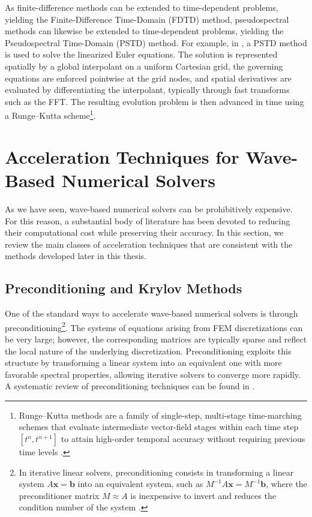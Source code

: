 \documentclass{Configuration_Files/PoliMi3i_thesis}
\newif\ifshowthesischanges
\DeclareRobustCommand{\thesischange}[2]{%
    \ifshowthesischanges
        \textcolor{#1}{#2}%
    \else
        #2%
    \fi
}
\def\thesischange#1#2{#2}%
\begin{document}
As finite-difference methods can be extended to time-dependent problems, yielding the Finite-Difference Time-Domain (FDTD) method, pseudospectral methods can likewise be extended to time-dependent problems, yielding the Pseudospectral Time-Domain (PSTD) method. For example, in \cite{hornikx_extended_2010}, a PSTD method is used to solve the linearized Euler equations. The solution is represented spatially by a global interpolant on a uniform Cartesian grid, the governing equations are enforced pointwise at the grid nodes, and spatial derivatives are evaluated by differentiating the interpolant, typically through fast transforms such as the FFT. The resulting evolution problem is then advanced in time using a Runge--Kutta scheme\footnote{\thesischange{red}{Runge--Kutta methods are a family of single-step, multi-stage time-marching schemes that evaluate intermediate vector-field stages within each time step $[t^n, t^{n+1}]$ to attain high-order temporal accuracy without requiring previous time levels \citep{quarteroni_numerical_2007}.}}.
%
\section{Acceleration Techniques for Wave-Based Numerical Solvers}
As we have seen, wave-based numerical solvers can be prohibitively expensive. For this reason, a substantial body of literature has been devoted to reducing their computational cost while preserving their accuracy. In this section, we review the main classes of acceleration techniques that are consistent with the methods developed later in this thesis.
%
\subsection{Preconditioning and Krylov Methods}
One of the standard ways to accelerate wave-based numerical solvers is through preconditioning\footnote{\thesischange{red}{In iterative linear solvers, preconditioning consists in transforming a linear system $A\mathbf{x}=\mathbf{b}$ into an equivalent system, such as $M^{-1}A\mathbf{x} = M^{-1}\mathbf{b}$, where the preconditioner matrix $M \approx A$ is inexpensive to invert and reduces the condition number of the system \citep{chen_matrix_2005}.}}. The systems of equations arising from FEM discretizations can be very large; however, the corresponding matrices are typically sparse and reflect the local nature of the underlying discretization. Preconditioning exploits this structure by transforming a linear system into an equivalent one with more favorable spectral properties, allowing iterative solvers to converge more rapidly. A systematic review of preconditioning techniques can be found in \cite{chen_matrix_2005}.
\end{document}
